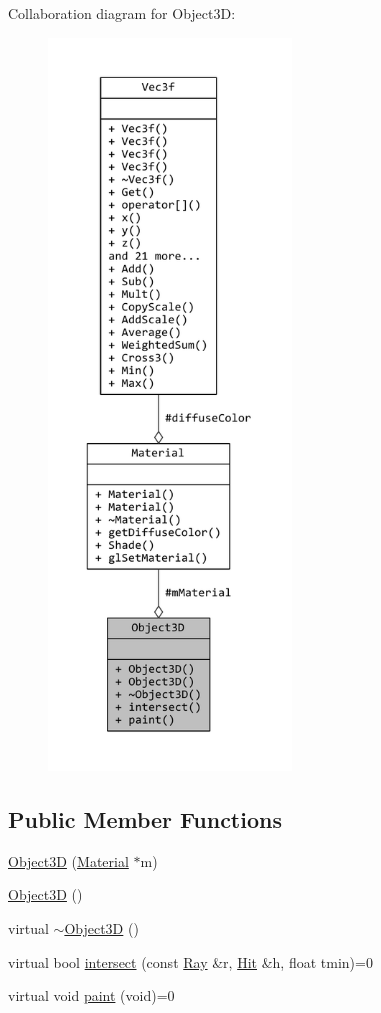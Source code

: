 Collaboration diagram for Object3\+D\+:
\nopagebreak
\begin{figure}[H]
\begin{center}
\leavevmode
\includegraphics[height=550pt]{classObject3D__coll__graph}
\end{center}
\end{figure}
\subsection*{Public Member Functions}
\begin{DoxyCompactItemize}
\item 
\hyperlink{classObject3D_ae29d1ad924cb8ab4b1b5c5647622f390}{Object3\+D} (\hyperlink{classMaterial}{Material} $\ast$m)
\item 
\hyperlink{classObject3D_ae3a1b17fb43ab59f5cf7b0ee21b9120b}{Object3\+D} ()
\item 
virtual \hyperlink{classObject3D_a0e0c43c27593f99b303319cbb54b9c50}{$\sim$\+Object3\+D} ()
\item 
virtual bool \hyperlink{classObject3D_a58f07cf2b37c5b6a1c796cd7a939f91b}{intersect} (const \hyperlink{classRay}{Ray} \&r, \hyperlink{classHit}{Hit} \&h, float tmin)=0
\item 
virtual void \hyperlink{classObject3D_a374ef54b92edff375d58f0100c33c373}{paint} (void)=0
\end{DoxyCompactItemize}
